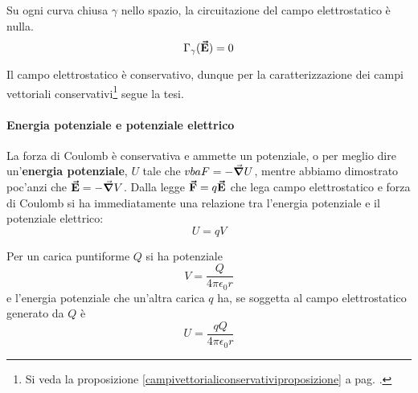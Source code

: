 \begin{corollary}
	Su ogni curva chiusa $\gamma$ nello spazio, la circuitazione del campo elettrostatico è nulla.
	\begin{equation}
		\Gamma_{\gamma}(\vb*{\va{E}})=0
	\end{equation}
\end{corollary}
\begin{demonstration}
	Il campo elettrostatico è conservativo, dunque per la caratterizzazione dei campi vettoriali conservativi\footnote{Si veda la proposizione \ref{campivettorialiconservativiproposizione} a pag. \pageref{campivettorialiconservativiproposizione}.} segue la tesi. 
\end{demonstration}%
\paragraph{Energia potenziale e potenziale elettrico}
La forza di Coulomb è conservativa e ammette un potenziale, o per meglio dire un'\textbf{energia potenziale}, $U$ tale che $vba{F}=-\grad{U}$, mentre abbiamo dimostrato poc'anzi che $\vb*{\va{E}}=-\grad{V}$. Dalla legge $\vb*{\va{F}}=q\vb*{\va{E}}$ che lega campo elettrostatico e forza di Coulomb si ha immediatamente una relazione tra l'energia potenziale e il potenziale elettrico:
\begin{equation}
	U=qV\label{EnergiaPotenziale}
\end{equation}
\begin{example}
	Per un carica puntiforme $Q$ si ha potenziale
	\begin{equation}
		V=\frac{Q}{4\pi\epsilon_0r}
	\end{equation}
	e l'energia potenziale che un'altra carica $q$ ha, se soggetta al campo elettrostatico generato da $Q$ è
	\begin{equation}
		U=\frac{qQ}{4\pi\epsilon_0r}
	\end{equation}
\end{example}
